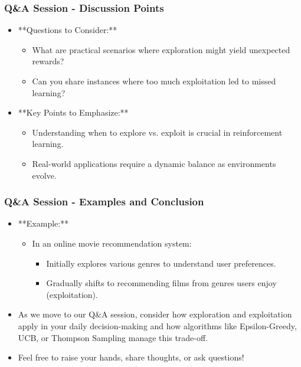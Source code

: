 \documentclass[aspectratio=169]{beamer}
\begin{document}
\begin{frame}[fragile]
    \frametitle{Q\&A Session - Discussion Points}
    \begin{itemize}
        \item **Questions to Consider:**
        \begin{itemize}
            \item What are practical scenarios where exploration might yield unexpected rewards?
            \item Can you share instances where too much exploitation led to missed learning?
        \end{itemize}
        \item **Key Points to Emphasize:**
        \begin{itemize}
            \item Understanding when to explore vs. exploit is crucial in reinforcement learning.
            \item Real-world applications require a dynamic balance as environments evolve.
        \end{itemize}
    \end{itemize}
\end{frame}

\begin{frame}[fragile]
    \frametitle{Q\&A Session - Examples and Conclusion}
    \begin{itemize}
        \item **Example:**
        \begin{itemize}
            \item In an online movie recommendation system:
                \begin{itemize}
                    \item Initially explores various genres to understand user preferences.
                    \item Gradually shifts to recommending films from genres users enjoy (exploitation).
                \end{itemize}
        \end{itemize}
        \item As we move to our Q\&A session, consider how exploration and exploitation apply in your daily decision-making and how algorithms like Epsilon-Greedy, UCB, or Thompson Sampling manage this trade-off.
        \item Feel free to raise your hands, share thoughts, or ask questions!
    \end{itemize}
\end{frame}
\end{document}
